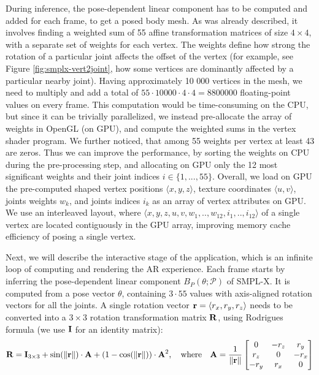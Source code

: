 During inference, the pose-dependent linear component has to be computed and added for each frame, to get a posed body mesh. As was already described, it involves finding a weighted sum of 55 affine transformation matrices of size $4 \times 4$, with a separate set of weights for each vertex. The weights define how strong the rotation of a particular joint affects the offset of the vertex (for example, see Figure \ref{fig:smplx-vert2joint}, how some vertices are dominantly affected by a particular nearby joint). Having approximately 10 000 vertices in the mesh, we need to multiply and add a total of $55 \cdot 10 000 \cdot 4 \cdot 4 = 8 800 000$ floating-point values on every frame. This computation would be time-consuming on the CPU, but since it can be trivially parallelized, we instead pre-allocate the array of weights in OpenGL (on GPU), and compute the weighted sums in the vertex shader program. We further noticed, that among 55 weights per vertex at least 43 are zeros. Thus we can improve the performance, by sorting the weights on CPU during the pre-processing step, and allocating on GPU only the 12 most significant weights  and their joint indices $i \in \{1,...,55\}$. Overall, we load on GPU the pre-computed shaped vertex positions $\langle x, y, z \rangle$, texture coordinates $\langle u, v \rangle$, joints weights $w_k$, and joints indices $i_k$ as an array of vertex attributes on GPU. We use an interleaved layout, where $\langle x, y, z, u, v, w_1, .., w_{12}, i_1, .., i_{12}\rangle$ of a single vertex are located contiguously in the GPU array, improving memory cache efficiency of posing a single vertex. 

Next, we will describe the interactive stage of the application, which is an infinite loop of computing and rendering the AR experience. Each frame starts by inferring the pose-dependent linear component $B_P(\theta; \mathcal{P})$ of SMPL-X. It is computed from a pose vector $\theta$, containing $3 \cdot 55$ values with axis-aligned rotation vectors for all the joints. A single rotation vector $\bm{\mathrm{r}} = \langle r_x, r_y, r_z \rangle$ needs to be converted into a $3\times3$ rotation transformation matrix $\bm{\mathrm{R}}$, using Rodrigues \cite{aux:rodrigues11} formula (we use $\bm{\mathrm{I}}$ for an identity matrix):
\begin{equation}
	\bm{\mathrm{R}} = \bm{\mathrm{I}}_{3\times3} + \text{sin}(\|\bm{\mathrm{r}}\|)\cdot \bm{\mathrm{A}} + (1-\text{cos}(\|\bm{\mathrm{r}}\|))\cdot \bm{\mathrm{A}}^2,
	\quad \text{where} \quad
	\bm{\mathrm{A}} = \dfrac{1}{\|\bm{\mathrm{r}}\|}
	\begin{bmatrix} 
		0 & -r_z & r_y \\
		r_z & 0 & -r_x \\
		-r_y & r_x & 0
	\end{bmatrix}
	\label{methods:eq:rodrigues}
\end{equation}

